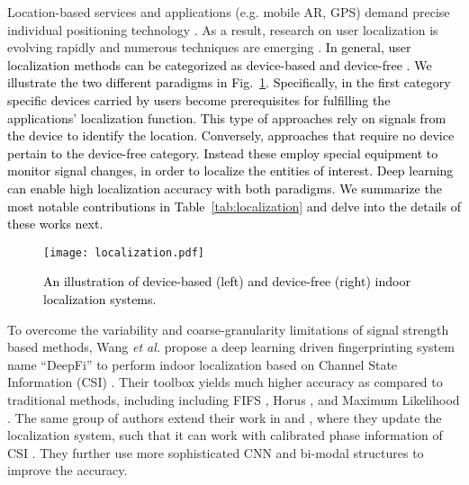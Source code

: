\documentclass[journal,comsoc,letter]{IEEEtran}
\newcommand{\rev}[1]{\textcolor{black}{#1}}
\begin{document}
Location-based services and applications (e.g. mobile AR, GPS) demand precise individual positioning technology \cite{xia2017indoor}. As a result, research on user localization is evolving rapidly and numerous techniques are emerging \cite{davidson2016survey}. \rev{In general, user localization methods can be categorized as device-based and device-free \cite{xiao2016survey}. We illustrate the two different paradigms in Fig.~\ref{fig:localization}. Specifically, in the first category specific devices carried by users become prerequisites for fulfilling the applications' localization function. This type of approaches rely on signals from the device to identify the location. Conversely, approaches that require no device pertain to the device-free category. Instead these employ special equipment to monitor signal changes, in order to localize the entities of interest. Deep learning can enable high localization accuracy with both paradigms. We summarize the most notable contributions in Table~\ref{tab:localization} and delve into the details of these works next.} 

\begin{figure}[t]
\begin{center}
\texttt{[image: localization.pdf]}
\caption{\label{fig:localization} \rev{An illustration of device-based (left) and device-free (right) indoor localization systems.}}
\end{center}
\end{figure}
To overcome the variability and coarse-granularity limitations of signal strength based methods, Wang \emph{et al.}  propose a deep learning driven fingerprinting  system name ``DeepFi'' to perform indoor localization based on Channel State Information (CSI) \cite{wang2015deepfi}. Their toolbox yields much higher accuracy as compared to traditional methods, including including FIFS \cite{xiao2012fifs}, Horus \cite{youssef2005horus}, and Maximum  Likelihood \cite{brunato2005statistical}. The same group of authors extend their work in \cite{wang2015phasefi, wang2016csi} and \cite{wang2017cifi, wang2017biloc}, where they update the localization system, such that it can work with calibrated phase information of CSI \cite{wang2015phasefi, wang2016csi, wang2017csi}. They further use more sophisticated CNN \cite{wang2017cifi, wang2018deep6} and bi-modal structures \cite{wang2017biloc} to improve the accuracy. 
\end{document}
